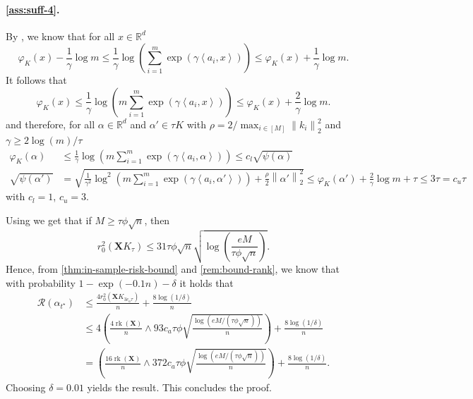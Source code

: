 \documentclass[a4paper]{article}
\newcommand{\pr}[1]{\left(#1\right)}
\newcommand{\norm}[1]{\left\|#1\right\|}
\newcommand{\inner}[2]{\left\langle #1,#2\right\rangle}
\newcommand{\X}[0]{\mathbf{X}}
\newcommand{\RR}[0]{\mathbb{R}}
\newcommand{\cR}[0]{\mathcal{R}}
\newcommand{\alphatstar}[0]{\alpha_{t^\star}}
\newcommand{\Kt}[0]{K_\tau}
\newcommand{\rzero}[0]{r_{0}}
\DeclareMathOperator{\rankOp}{rk}
\newcommand{\rank}[1]{\rankOp\pr{#1}}
\theoremstyle{thmstyle}
\theoremstyle{defstyle}
\theoremstyle{remark}
\begin{document}
    \paragraph{\ref{ass:suff-4}.} By \cite[Example 4.5]{Beck2012smoothing}, we know that for all $x\in\RR^d$
    \begin{equation*}
        \varphi_K(x)-\frac{1}{\gamma}\log m \leq \frac{1}{\gamma}\log \pr{\sum_{i=1}^m \exp\pr{\gamma \inner{a_i}{x}}} \leq \varphi_K(x) +\frac{1}{\gamma}\log m.
    \end{equation*}
    It follows that
    \begin{equation*}
        \varphi_K(x) \leq \frac{1}{\gamma}\log \pr{m\sum_{i=1}^m \exp\pr{\gamma \inner{a_i}{x}}} \leq \varphi_K(x) +\frac{2}{\gamma}\log m.
    \end{equation*}
    and therefore, for all $\alpha\in \RR^d$ and $\alpha'\in \tau K$ with $\rho = 2/ \max_{i\in[M]} \norm{k_i}_2^2$ and $\gamma \geq 2\log (m)/\tau$
    \begin{align*}
        \varphi_K(\alpha) & \leq  \frac{1}{\gamma}\log \pr{m\sum_{i=1}^m \exp\pr{\gamma \inner{a_i}{\alpha}}} \leq c_l\sqrt{\psi(\alpha)} \\
        \sqrt{\psi(\alpha')} &= \sqrt{\frac{1}{\gamma^2}\log^2 \pr{m\sum_{i=1}^m \exp\pr{\gamma \inner{a_i}{\alpha'}}} +\frac{\rho}{2}\norm{\alpha'}_2^2} \leq \varphi_K(\alpha')+\frac{2}{\gamma}\log m +\tau \leq 3\tau = c_u\tau
    \end{align*}
    with $c_l=1$, $c_u = 3$.

    Using \cite[Proposition 5]{Bellec2017localizedgaussianwidthmconvex} we get that if $M\geq \tau \phi \sqrt{n}$, then
    \begin{equation*}
        \rzero^2(\X \Kt) \leq 31 \tau \phi \sqrt{n}\sqrt{\log\pr{\frac{eM}{\tau\phi \sqrt{n}}}}.
    \end{equation*}
    Hence, from \cref{thm:in-sample-risk-bound} and \cref{rem:bound-rank}, we know that with probability $1-\exp(-0.1n)-\delta$ it holds that
    \begin{align*}
        \cR(\alphatstar) &\leq \frac{4\rzero^2(\X K_{3c_a\tau})}{n}+\frac{8\log(1/\delta)}{n} \\
        &\leq 4\pr{\frac{4\rank{\X}}{n}\wedge 93 c_a \tau \phi \sqrt{\frac{\log\pr{eM/(\tau\phi \sqrt{n})}}{n}}} +\frac{8\log(1/\delta)}{n} \\
        &=\pr{\frac{16\rank{\X}}{n}\wedge 372 c_a \tau \phi \sqrt{\frac{\log\pr{eM/(\tau\phi \sqrt{n})}}{n}}} +\frac{8\log(1/\delta)}{n}.
    \end{align*}
    Choosing $\delta=0.01$ yields the result.
    This concludes the proof.
\end{document}
